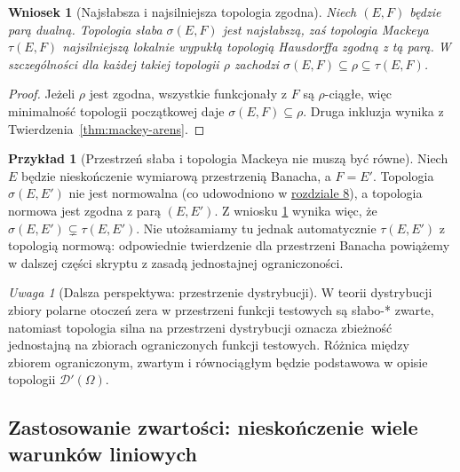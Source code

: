 \documentclass[11pt,a4paper]{article}
\numberwithin{equation}{section}
\theoremstyle{plain}
\newtheorem{wniosek}[twierdzenie]{Wniosek}
\theoremstyle{definition}
\newtheorem{przyklad}[twierdzenie]{Przykład}
\theoremstyle{remark}
\newtheorem{uwaga}[twierdzenie]{Uwaga}
\begin{document}
\begin{wniosek}[Najsłabsza i najsilniejsza topologia zgodna]\label{cor:mackey-extremes}
Niech $(E,F)$ będzie parą dualną. Topologia słaba
$\sigma(E,F)$ jest najsłabszą, zaś topologia Mackeya
$\tau(E,F)$ najsilniejszą lokalnie wypukłą topologią
Hausdorffa zgodną z tą parą. W szczególności dla każdej
takiej topologii $\rho$ zachodzi
$\sigma(E,F)\subseteq\rho\subseteq\tau(E,F)$.
\end{wniosek}
\begin{proof}
Jeżeli $\rho$ jest zgodna, wszystkie funkcjonały z $F$
są $\rho$-ciągłe, więc minimalność topologii początkowej
daje $\sigma(E,F)\subseteq\rho$. Druga inkluzja wynika
z Twierdzenia~\ref{thm:mackey-arens}.
\end{proof}

\begin{przyklad}[Przestrzeń słaba i topologia Mackeya nie muszą być równe]
Niech $E$ będzie nieskończenie wymiarową przestrzenią Banacha,
a $F=E'$. Topologia $\sigma(E,E')$ nie jest normowalna
(co udowodniono w \hyperref[sec:topologie-slabe]{rozdziale 8}), a topologia normowa
jest zgodna z parą $(E,E')$. Z wniosku
\ref{cor:mackey-extremes} wynika więc, że
$\sigma(E,E')\subsetneq\tau(E,E')$.
Nie utożsamiamy tu jednak automatycznie $\tau(E,E')$
z topologią normową: odpowiednie twierdzenie dla przestrzeni
Banacha powiążemy w dalszej części skryptu z zasadą
jednostajnej ograniczoności.
\end{przyklad}

\begin{uwaga}[Dalsza perspektywa: przestrzenie dystrybucji]
W teorii dystrybucji zbiory polarne otoczeń zera w przestrzeni
funkcji testowych są słabo-* zwarte, natomiast topologia silna
na przestrzeni dystrybucji oznacza zbieżność jednostajną
na zbiorach ograniczonych funkcji testowych. Różnica między
zbiorem ograniczonym, zwartym i równociągłym będzie podstawowa
w opisie topologii $\mathcal D'(\Omega)$.
\end{uwaga}

\subsection{Zastosowanie zwartości: nieskończenie wiele warunków liniowych}
\end{document}
